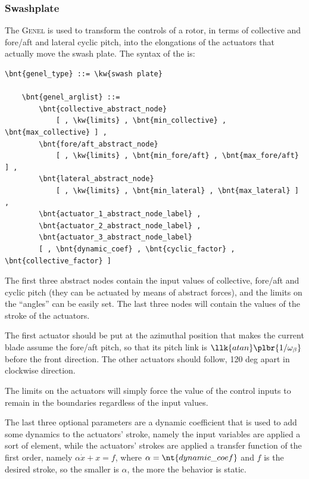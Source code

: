 \subsubsection{Swashplate}
\label{sec:EL:GENEL:SWASHPLATE}
The  \textsc{Genel} is used to transform the controls 
of a rotor, in terms of collective and fore/aft and lateral cyclic pitch, 
into the elongations of the actuators that actually move the swash plate.
The syntax of the  is:
\begin{Verbatim}[commandchars=\\\{\}]
    \bnt{genel_type} ::= \kw{swash plate}

    \bnt{genel_arglist} ::=
        \bnt{collective_abstract_node}
            [ , \kw{limits} , \bnt{min_collective} , \bnt{max_collective} ] ,
        \bnt{fore/aft_abstract_node}
            [ , \kw{limits} , \bnt{min_fore/aft} , \bnt{max_fore/aft} ] ,
        \bnt{lateral_abstract_node} 
            [ , \kw{limits} , \bnt{min_lateral} , \bnt{max_lateral} ] ,
        \bnt{actuator_1_abstract_node_label} ,
        \bnt{actuator_2_abstract_node_label} ,
        \bnt{actuator_3_abstract_node_label} 
        [ , \bnt{dynamic_coef} , \bnt{cyclic_factor} , \bnt{collective_factor} ]
\end{Verbatim}
The first three abstract nodes contain the input values 
of collective, fore/aft and cyclic pitch
(they can be actuated by means of abstract forces),
and the limits on the ``angles'' can be easily set. 
The last three nodes will contain the values of the stroke of the actuators.

The first actuator should be put at the azimuthal position 
that makes the current blade assume the fore/aft pitch,
so that its pitch link is $\llk{atan}\plbr{1/\omega_{\beta}}$
before the front direction.
The other actuators should follow, 120 deg apart in clockwise direction.

The limits on the actuators will simply force the value of the control
inputs to remain in the boundaries regardless of the input values.

The last three optional parameters are a dynamic coefficient that is used to
add some dynamics to the actuators' stroke, namely the input variables are
applied a sort of   element, while the
actuators' strokes are applied a transfer function of the first order, namely
$ \alpha\dot{x}+x=f $, where $ \alpha=\nt{dynamic\_coef} $ and $ f $ is
the desired stroke, so the smaller is $ \alpha $, the more the behavior is
static.

